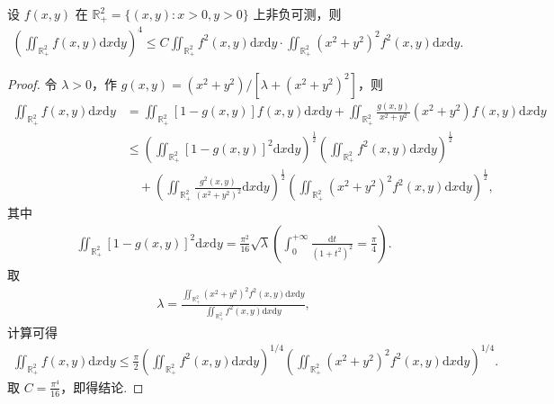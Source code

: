 \documentclass[../../main.tex]{subfiles}%
\begin{document}
\begin{example}
设 $f(x, y)$ 在 $\mathbb{R}_+^2 = \{(x, y): x>0, y>0\}$ 上非负可测，则
\begin{align*}
\left( \iint_{\mathbb{R}_+^2} f(x, y) \mathrm{d}x\mathrm{d}y \right)^4 \leqslant C \iint_{\mathbb{R}_+^2} f^2(x, y) \mathrm{d}x\mathrm{d}y \cdot \iint_{\mathbb{R}_+^2} (x^2 + y^2)^2 f^2(x, y) \mathrm{d}x\mathrm{d}y.
\end{align*}
\end{example}
\begin{proof}

令 $\lambda > 0$，作 $g(x, y) = (x^2 + y^2)/[\lambda + (x^2 + y^2)^2]$，则
\begin{align*}
\iint_{\mathbb{R}_+^2} f(x, y) \mathrm{d}x\mathrm{d}y &= \iint_{\mathbb{R}_+^2} [1 - g(x, y)] f(x, y) \mathrm{d}x\mathrm{d}y + \iint_{\mathbb{R}_+^2} \frac{g(x, y)}{x^2 + y^2} (x^2 + y^2) f(x, y) \mathrm{d}x\mathrm{d}y \\
&\leqslant \left( \iint_{\mathbb{R}_+^2} [1 - g(x, y)]^2 \mathrm{d}x\mathrm{d}y \right)^{\frac{1}{2}} \left( \iint_{\mathbb{R}_+^2} f^2(x, y) \mathrm{d}x\mathrm{d}y \right)^{\frac{1}{2}} \\
&\quad + \left( \iint_{\mathbb{R}_+^2} \frac{g^2(x, y)}{(x^2 + y^2)^2} \mathrm{d}x\mathrm{d}y \right)^{\frac{1}{2}} \left( \iint_{\mathbb{R}_+^2} (x^2 + y^2)^2 f^2(x, y) \mathrm{d}x\mathrm{d}y \right)^{\frac{1}{2}},
\end{align*}
其中
\begin{align*}
\iint_{\mathbb{R}_+^2} [1 - g(x, y)]^2 \mathrm{d}x\mathrm{d}y = \frac{\pi^2}{16} \sqrt{\lambda} \left( \int_0^{+\infty} \frac{\mathrm{d}t}{(1 + t^2)^2} = \frac{\pi}{4} \right).
\end{align*}
取
\begin{align*}
\lambda = \frac{\iint_{\mathbb{R}_+^2} (x^2 + y^2)^2 f^2(x, y) \mathrm{d}x\mathrm{d}y}{\iint_{\mathbb{R}_+^2} f^2(x, y) \mathrm{d}x\mathrm{d}y},
\end{align*}
计算可得
\begin{align*}
\iint_{\mathbb{R}_+^2} f(x, y) \mathrm{d}x\mathrm{d}y \leqslant \frac{\pi}{2} \left( \iint_{\mathbb{R}_+^2} f^2(x, y) \mathrm{d}x\mathrm{d}y \right)^{1/4} \left( \iint_{\mathbb{R}_+^2} (x^2 + y^2)^2 f^2(x, y) \mathrm{d}x\mathrm{d}y \right)^{1/4}.
\end{align*}
取 $C = \frac{\pi^4}{16}$，即得结论.

\end{proof}
\end{document}
